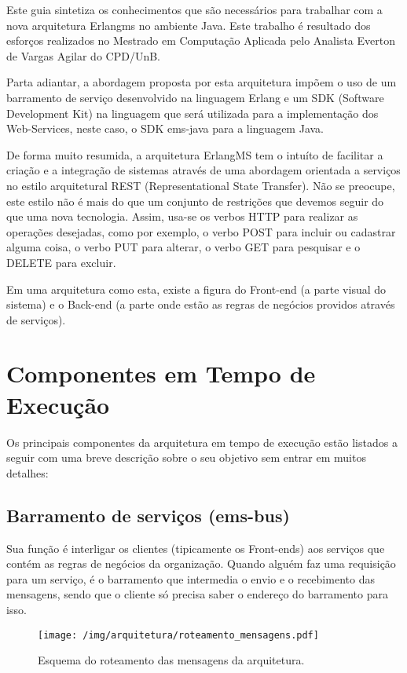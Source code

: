 Este guia sintetiza os conhecimentos que são necessários para trabalhar com a nova arquitetura 
Erlangms no ambiente Java. Este trabalho é resultado dos esforços realizados no Mestrado em Computação 
Aplicada pelo Analista Everton de Vargas Agilar do CPD/UnB.

Parta adiantar, a abordagem proposta por esta arquitetura
impõem o uso de um barramento de serviço desenvolvido na 
linguagem Erlang e um SDK (Software Development Kit) na linguagem 
que será utilizada para a implementação dos Web-Services, neste caso, o SDK ems-java 
para a linguagem Java. 

De forma muito resumida, a arquitetura ErlangMS tem o intuíto de facilitar a 
criação e a integração de sistemas através de uma abordagem
orientada a serviços no estilo arquitetural REST (Representational State Transfer). 
Não se preocupe, este estilo não é mais do que um conjunto de restrições que devemos 
seguir do que uma nova tecnologia. Assim, usa-se 
os verbos HTTP para realizar as operações desejadas, como por exemplo, o verbo POST para incluir
ou cadastrar alguma coisa, o verbo PUT para alterar, o verbo GET para pesquisar e o 
DELETE para excluir.

Em uma arquitetura como esta, existe a figura do Front-end (a parte visual do sistema) 
e o Back-end (a parte onde estão as regras de negócios providos através de serviços).



\section{Componentes em Tempo de Execução}

Os principais componentes da arquitetura em tempo de execução estão listados a seguir
com uma breve descrição sobre o seu objetivo sem entrar em muitos detalhes:


\subsection{Barramento de serviços (ems-bus)}

Sua função é interligar os clientes (tipicamente os Front-ends) 
aos serviços que contém as regras de negócios da organização. Quando alguém faz uma requisição
para um serviço, é o barramento que intermedia o envio e o recebimento das mensagens, sendo que o cliente
só precisa saber o endereço do barramento para isso.

\begin{figure}[htb]
\centering
\texttt{[image: /img/arquitetura/roteamento\_mensagens.pdf]}
\caption{Esquema do roteamento das mensagens da arquitetura.}
\label{fig:roteamento_mensagens}
\end{figure}
\FloatBarrier


